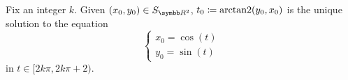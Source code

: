 \begin{proposition}\label{thm:arctantwo}
  Fix an integer \( k \). Given \( (x_0, y_0) \in S_{\BR^2} \), \( t_0 \coloneqq \operatorname{arctan2}(y_0, x_0) \) is the unique solution to the equation
  \begin{equation}\label{thm:arctantwo/equation}
    \begin{cases}
      x_0 = \cos(t) \\
      y_0 = \sin(t)
    \end{cases}
  \end{equation}
  in \( t \in [2k\pi, 2k\pi + 2) \).
\end{proposition}
